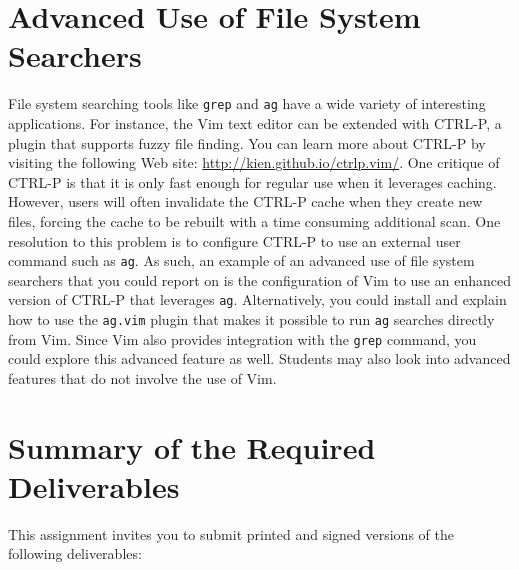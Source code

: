 \section*{Advanced Use of File System Searchers}

File system searching tools like {\tt grep} and {\tt ag} have a wide variety of interesting applications.  For instance,
the Vim text editor can be extended with CTRL-P, a plugin that supports fuzzy file finding.  You can learn more about
CTRL-P by visiting the following Web site: \url{http://kien.github.io/ctrlp.vim/}. One critique of CTRL-P is that it is
only fast enough for regular use when it leverages caching.  However, users will often invalidate the CTRL-P cache when
they create new files, forcing the cache to be rebuilt with a time consuming additional scan. One resolution to this
problem is to configure CTRL-P to use an external user command such as {\tt ag}.  As such, an example of an advanced use
of file system searchers that you could report on is the configuration of Vim to use an enhanced version of CTRL-P that
leverages {\tt ag}. Alternatively, you could install and explain how to use the {\tt ag.vim} plugin that makes it
possible to run {\tt ag} searches directly from Vim. Since Vim also provides integration with the {\tt grep} command,
you could explore this advanced feature as well. Students may also look into advanced features that do not involve the
use of Vim.

\section*{Summary of the Required Deliverables}

This assignment invites you to submit printed and signed versions of the following deliverables: 

